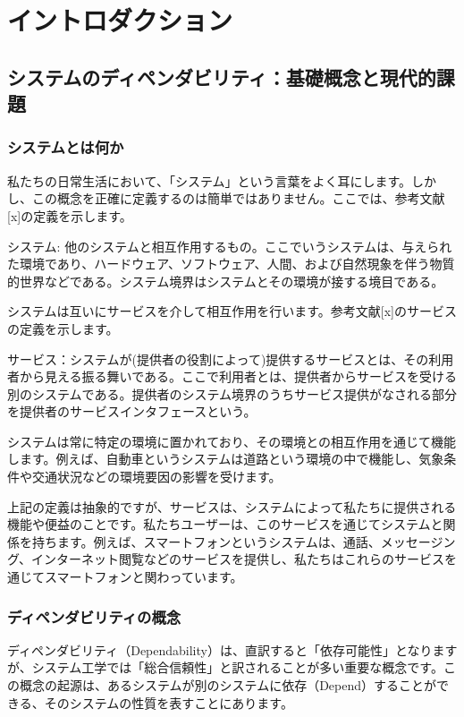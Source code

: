 \chapter{イントロダクション}
\label{chap1}

\section{システムのディペンダビリティ：基礎概念と現代的課題}

\subsection{システムとは何か}

私たちの日常生活において、「システム」という言葉をよく耳にします。しかし、この概念を正確に定義するのは簡単ではありません。ここでは、参考文献[x]の定義を示します。

システム: 他のシステムと相互作用するもの。ここでいうシステムは、与えられた環境であり、ハードウェア、ソフトウェア、人間、および自然現象を伴う物質的世界などである。システム境界はシステムとその環境が接する境目である。

システムは互いにサービスを介して相互作用を行います。参考文献[x]のサービスの定義を示します。

サービス：システムが(提供者の役割によって)提供するサービスとは、その利用者から見える振る舞いである。ここで利用者とは、提供者からサービスを受ける別のシステムである。提供者のシステム境界のうちサービス提供がなされる部分を提供者のサービスインタフェースという。

システムは常に特定の環境に置かれており、その環境との相互作用を通じて機能します。例えば、自動車というシステムは道路という環境の中で機能し、気象条件や交通状況などの環境要因の影響を受けます。

上記の定義は抽象的ですが、サービスは、システムによって私たちに提供される機能や便益のことです。私たちユーザーは、このサービスを通じてシステムと関係を持ちます。例えば、スマートフォンというシステムは、通話、メッセージング、インターネット閲覧などのサービスを提供し、私たちはこれらのサービスを通じてスマートフォンと関わっています。

\subsection{ディペンダビリティの概念}

ディペンダビリティ（Dependability）は、直訳すると「依存可能性」となりますが、システム工学では「総合信頼性」と訳されることが多い重要な概念です。この概念の起源は、あるシステムが別のシステムに依存（Depend）することができる、そのシステムの性質を表すことにあります。

